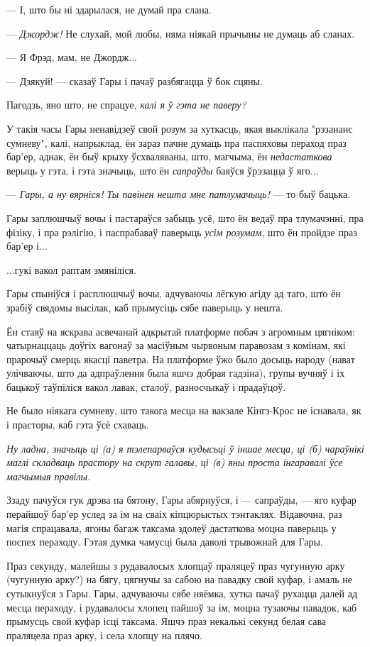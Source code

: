 --- І, што бы ні здарылася, не думай пра слана.

--- \emph{Джордж!} Не слухай, мой любы, няма ніякай прычыны не думаць аб сланах.

--- Я Фрэд, мам, не Джордж...

--- Дзякуй! --- сказаў Гары і пачаў разбягацца ў бок сцяны.

Пагодзь, яно што, не спрацуе, \emph{калі я ў гэта не паверу?}

У такія часы Гары ненавідзеў свой розум за хуткасць, якая выклікала 
"рэзананс сумневу", калі, напрыклад, ён зараз пачне думаць пра паспяховы пераход
праз бар'ер, аднак, ён быў крыху ўсхваляваны, што, магчыма, ён  \emph{недастаткова}
верыць у гэта, і гэта значыць, што ён \emph{сапраўды} баяўся ўрэзацца ў яго...

--- \emph{Гары, а ну вярніся! Ты павінен нешта мне патлумачыць!} --- то быў бацька.

Гары заплюшчыў вочы і пастараўся забыць усё, што ён ведаў пра тлумачэнні, пра
фізіку, і пра рэлігію, і паспрабаваў паверыць \emph{усім розумам}, што ён 
пройдзе праз бар'ер і...

...гукі вакол раптам змяніліся.

Гары спыніўся і расплюшчыў вочы, адчуваючы лёгкую агіду ад таго, што ён зрабіў
свядомы высілак, каб прымусіць сябе паверыць у нешта.

Ён стаяў на яскрава асвечанай адкрытай платформе побач з агромным цягніком:
чатырнаццаць доўгіх вагонаў за масіўным чырвоным паравозам з комінам,
які прарочыў смерць якасці паветра. На платформе ўжо было досыць народу
(нават улічваючы, што да адпраўлення была яшчэ добрая гадзіна),
групы вучняў і іх бацькоў таўпіліся вакол лавак, сталоў, разносчыкаў і 
прадаўцоў.

Не было ніякага сумневу, што такога месца на вакзале Кінгз-Крос не існавала, 
як і прасторы, каб гэта ўсё схаваць.

\emph{Ну ладна, значыць ці (а) я тэлепарваўся кудысьці ў іншае месца, ці
(б) чараўнікі маглі складваць прастору на скрут галавы,
ці (в) яны проста інгаравалі ўсе магчымыя правілы.}

Ззаду пачуўся гук дрэва па бятону, Гары абярнуўся, і --- сапраўды, ---
яго куфар перайшоў бар'ер услед за ім на сваіх кіпцюрыстых тэнтаклях. Відавочна,
раз магія спрацавала, ягоны багаж таксама здолеў дастаткова моцна паверыць у 
поспех пераходу. Гэтая думка чамусці была даволі трывожнай для Гары.

Праз секунду, малейшы з рудавалосых хлопцаў праляцеў праз чугунную арку 
(чугунную арку?) на бягу, цягнучы за сабою на павадку свой куфар, і амаль не 
сутыкнуўся з Гары. Гары, адчуваючы сябе няёмка, хутка пачаў рухацца далей ад месца
пераходу, і рудавалосы хлопец пайшоў за ім, моцна тузаючы павадок, каб прымусць
свой куфар ісці таксама. Яшчэ праз некалькі секунд белая сава праляцела праз
арку, і села хлопцу на плячо.

